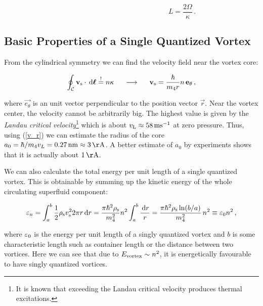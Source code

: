 \vspace{-0.5cm}
\begin{equation}
\hspace{6cm}
L = \frac{2\Omega}{\kappa}\,.
\label{L}
\end{equation}



\subsection*{Basic Properties of a Single Quantized Vortex}

From the cylindrical symmetry we can find the velocity field near the vortex core:

\begin{equation}
\oint_{\mathcal{C}} \mathbf{v_{\mathrm{s}}} \cdot \,\mathrm{d}\mathbf{\boldsymbol{\ell}}
\stackrel{!}{=} n \kappa
\hspace{5mm}
\longrightarrow
\hspace{5mm}
\mathbf{v_{\mathrm{s}}} = \frac{\hbar}{m_4 r}n\, \mathbf{e_{\theta}}\,,
\label{v_r}
\end{equation}

where $\vec{e_{\theta}}$ is an unit vector perpendicular to the position vector $\vec{r}$. Near the vortex center, the velocity cannot be arbitrarily big. The highest value is given by the \textit{Landau critical velocity}\footnote{It is known\cite{tony} that exceeding the Landau critical velocity produces thermal excitations.} which is about $v_{\mathrm{L}} \approx 58 \,\mathrm{ms}^{-1}$ at zero pressure.
Thus, using (\ref{v_r})  we can estimate the radius of the core $a_0 = \hbar / m_4 v_L = 0.27 \unit{nm} \approx 3 \unit{\AA}$. A better estimate of $a_0$ by experiments shows that it is actually about $1 \unit{\AA}$.

We can also calculate the total energy per unit length of a single quantized vortex. This is obtainable by summing up the kinetic energy of the whole circulating superfluid component:

\begin{equation}
\varepsilon_n
= \int_a^b \frac{1}{2} \rho_{\mathrm{s}} v_{\mathrm{s}}^2 2\pi r\,\mathrm{d}r
= \frac{\pi \hbar^2 \rho_{\mathrm{s}}}{m_4^2} n^2 \int_a^b \frac{\,\mathrm{d}r}{r}
= \frac{\pi \hbar^2 \rho_{\mathrm{s}} \ln(b/a)}{m_4^2}\, n^2
\equiv \varepsilon_0 n^2\,,
\label{eps_n}
\end{equation}

where $\varepsilon_0$ is the energy per unit length of a singly quantized vortex and $b$ is some characteristic length such as container length or the distance between two vortices. Here we can see that due to $E_{\mathrm{vortex}} \sim n^2$, it is energetically favourable to have singly quantized vortices.

